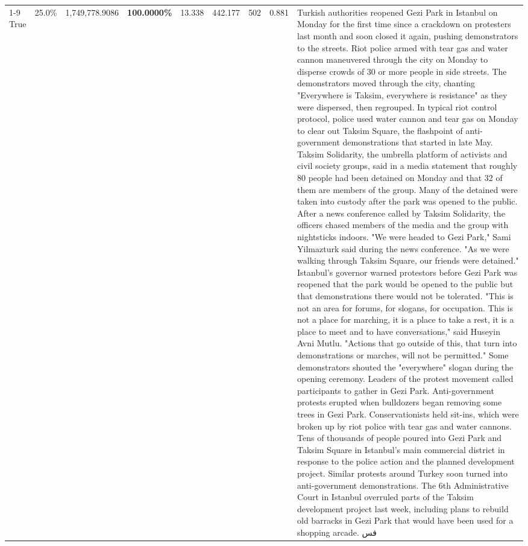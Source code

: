 \begin{table}[H]
\begin{tabular}{lllrlllll}
\cline{1-9}
True & 25.0\% & 1,749,778.9086 & \bfseries \color{red} 100.0000\% & 13.338 & 442.177 & 502 & 0.881 & Turkish authorities reopened Gezi Park in Istanbul on Monday for the first time since a crackdown on protesters last month and soon closed it again, pushing demonstrators to the streets. Riot police armed with tear gas and water cannon maneuvered through the city on Monday to disperse crowds of 30 or more people in side streets. The demonstrators moved through the city, chanting "Everywhere is Taksim, everywhere is resistance" as they were dispersed, then regrouped. In typical riot control protocol, police used water cannon and tear gas on Monday to clear out Taksim Square, the flashpoint of anti-government demonstrations that started in late May. Taksim Solidarity, the umbrella platform of activists and civil society groups, said in a media statement that roughly 80 people had been detained on Monday and that 32 of them are members of the group. Many of the detained were taken into custody after the park was opened to the public. After a news conference called by Taksim Solidarity, the officers chased members of the media and the group with nightsticks indoors. "We were headed to Gezi Park," Sami Yilmazturk said during the news conference. "As we were walking through Taksim Square, our friends were detained." Istanbul's governor warned protestors before Gezi Park was reopened that the park would be opened to the public but that demonstrations there would not be tolerated. "This is not an area for forums, for slogans, for occupation. This is not a place for marching, it is a place to take a rest, it is a place to meet and to have conversations," said Huseyin Avni Mutlu. "Actions that go outside of this, that turn into demonstrations or marches, will not be permitted." Some demonstrators shouted the "everywhere" slogan during the opening ceremony. Leaders of the protest movement called participants to gather in Gezi Park. Anti-government protests erupted when bulldozers began removing some trees in Gezi Park. Conservationists held sit-ins, which were broken up by riot police with tear gas and water cannons. Tens of thousands of people poured into Gezi Park and Taksim Square in Istanbul's main commercial district in response to the police action and the planned development project. Similar protests around Turkey soon turned into anti-government demonstrations. The 6th Administrative Court in Istanbul overruled parts of the Taksim development project last week, including plans to rebuild old barracks in Gezi Park that would have been used for a shopping arcade. فس \\

\end{tabular}
\end{table}
